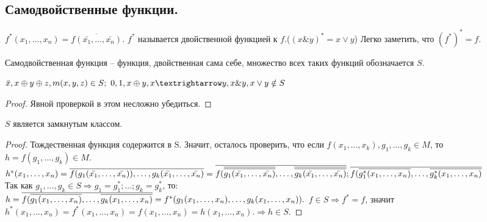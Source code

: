 \subsection{Самодвойственные функции.}
	$f^*(x_1,\ldots,x_n)=\overline{f(\bar{x_1},\ldots,\bar{x_n})}.$ $f^*$ называется двойственной функцией к $f$.($(x\&y)^*=x \vee y$)	
	Легко заметить, что $(f^*)^*=f.$
	\begin{definition}
		Самодвойственная функция -- функция, двойственная сама себе, множество всех таких функций обозначается $S$.
	\end{definition}
\begin{statement}
	$\bar{x},x\oplus y \oplus z, m(x,y,z) \in S; ~
	0,1,x\oplus y, x\textrightarrow y, x \& y, x \vee y \notin S $ 
\end{statement}
\begin{proof}
	Явной проверкой в этом несложно убедиться. 
\end{proof}	
\begin{lemma}
	$S$ является замкнутым классом.
\end{lemma}
\begin{proof}
	Тождественная функция содержится в S. Значит, осталось проверить, что если $f(x_1, \ldots,x_k), g_1, \ldots, g_k \in M$, то $h=f(g_1,\ldots,g_k) \in M $. \\
	$h^*(x_1,\ldots,x_n)=\overline{f(g_1(\bar{x_1},\ldots,\bar{x_n})),\ldots,g_k(\bar{x_1},\ldots,\bar{x_n})}=\overline{f(\overline{\overline{g_1(\bar{x_1},\ldots,\bar{x_n})}},\ldots,\overline{\overline{g_k(\bar{x_1},\ldots,\bar{x_n})}}}; \\\overline{f(\overline{g^*_{1}({x_1},\ldots,{x_n})},\ldots,\overline{g^*_k({x_1},\ldots,{x_n})}} $ \\
	Так как $g_1,\ldots,g_k \in S \Rightarrow g_1=g^*_1;\ldots;g_k=g^*_k$, то: \\
	$h=\overline{f(\overline{g_{1}({x_1},\ldots,{x_n})},\ldots,\overline{g_k({x_1},\ldots,{x_n})}}=f^*(g_1(x_1,\ldots, x_n),\ldots,g_k(x_1,\ldots,x_n)).\\ $
	$f \in S \Rightarrow f^*=f$, значит \\
	$h^*(x_1,\ldots,x_n)=f^*(x_1,\ldots,x_n)=f(x_1,\ldots,x_n)=h(x_1,\ldots,x_n). \Rightarrow h \in S.$
\end{proof}
%